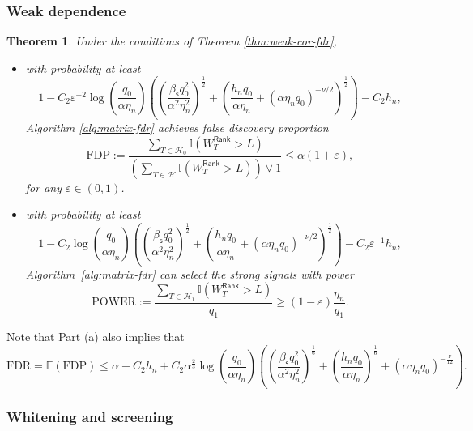 \documentclass[12pt]{article}
\newcommand{\E}{\mathbb{E}}
\newcommand{\cH}{\mathcal{H}}
\newcommand{\bbI}{\mathbb{I}}
\newtheorem{Theorem}{Theorem}
\theoremstyle{plain}
\begin{document}
\subsubsection{Weak dependence}

\begin{Theorem}
	Under the conditions of Theorem \ref{thm:weak-cor-fdr},
    \begin{itemize}
\item[(a)] with probability at least   
$$
1-C_2\varepsilon^{-2}\log(\frac{q_0 }{\alpha \eta_n})\left( \left(\frac{\beta_{\mathsf{s}} q_0^2 }{ \alpha^2\eta_n^2}\right)^{\frac{1}{2}} + \left(\frac{h_n q_0}{\alpha \eta_n} +(\alpha\eta_n q_0)^{-\nu/2} \right)^{\frac{1}{2}}\right)- C_2 h_n,
$$
Algorithm \ref{alg:matrix-fdr} achieves false discovery proportion
\begin{equation}\label{eq:thm-weak-cor-fdr}
    \mathrm{FDP}:=\frac{\sum_{T\in \cH_0  } \bbI(W_T^{\mathsf{Rank}} >L ) }{\left( \sum_{T\in \cH  } \bbI(W_T^{\mathsf{Rank}} >L ) \right) \vee 1 } \le \alpha(1+\varepsilon),
\end{equation}
for any $\varepsilon\in(0,1)$. 
\item[(b)] with probability at least
$$
1-C_2 \log(\frac{q_0 }{\alpha \eta_n})\left( \left(\frac{\beta_{\mathsf{s}} q_0^2 }{ \alpha^2\eta_n^2}\right)^{\frac{1}{2}} + \left(\frac{h_n q_0}{\alpha \eta_n}+(\alpha\eta_n q_0)^{-\nu/2} \right)^{\frac{1}{2}}\right)- C_2 \varepsilon^{-1} h_n,
$$
Algorithm~\ref{alg:matrix-fdr} can select the strong signals with power 
\begin{equation}\label{eq:thm-weak-cor-power}
   \mathrm{POWER}:= \frac{\sum_{T\in \cH_1  } \bbI(W_T^{\mathsf{Rank}} >L ) }{q_1} \ge (1-\varepsilon)\frac{\eta_n}{q_1}.
\end{equation}
\end{itemize}
\end{Theorem}

Note that Part (a) also implies that
\begin{equation}\label{eq:fdr-exp-exact}
     \text{FDR}=\E (\text{FDP})\le \alpha+ C_2h_n+C_2\alpha^{\frac{2}{3}}\log(\frac{q_0 }{\alpha \eta_n})\left( \left(\frac{\beta_{\mathsf{s}} q_0^2 }{ \alpha^2\eta_n^2}\right)^{\frac{1}{6}} + \left(\frac{h_n q_0}{\alpha \eta_n}\right)^{\frac{1}{6}} +\left(\alpha\eta_n q_0\right)^{-\frac{\nu}{12}}  \right).
\end{equation}

\subsubsection{Whitening and screening}
\end{document}
